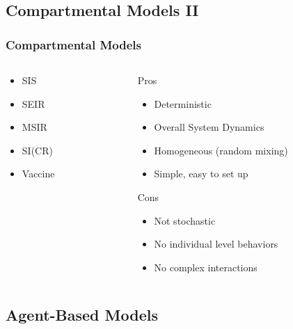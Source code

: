 \documentclass[compress]{beamer}
\begin{document}
\subsection{Compartmental Models II}
    \begin{frame}[Basic2] \frametitle{Compartmental Models}
        \begin{columns}
            \begin{column}{0.4\textwidth}
                
                \begin{itemize}
                    \item SIS
                    \item SEIR
                    \item MSIR
                    \item SI(CR)
                    \item Vaccine
                \end{itemize}
            \end{column}
            \begin{column}{0.6\textwidth}
                \vspace{2mm}
                
                Pros
                \begin{itemize}
                    \item Deterministic
                    \item Overall System Dynamics
                    \item Homogeneous (random mixing)
                    \item Simple, easy to set up
                \end{itemize}
                Cons
                \begin{itemize}
                    \item Not stochastic
                    \item No individual level behaviors
                    \item No complex interactions
                \end{itemize}
            \end{column}
        \end{columns}
    \end{frame}

\subsection{Agent-Based Models}
\end{document}
